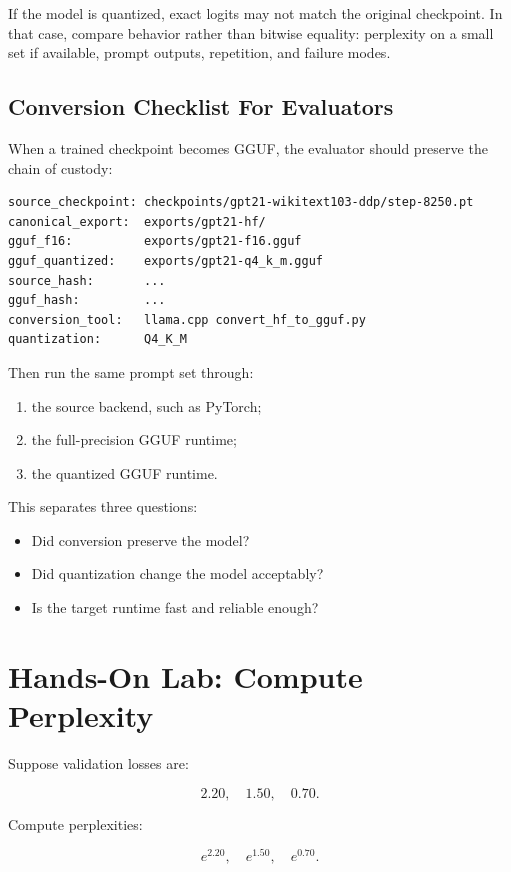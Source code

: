 If the model is quantized, exact logits may not match the original checkpoint. In that
case, compare behavior rather than bitwise equality: perplexity on a small set if
available, prompt outputs, repetition, and failure modes.

\subsection{Conversion Checklist For Evaluators}

When a trained checkpoint becomes GGUF, the evaluator should preserve the chain of
custody:

\begin{lstlisting}
source_checkpoint: checkpoints/gpt21-wikitext103-ddp/step-8250.pt
canonical_export:  exports/gpt21-hf/
gguf_f16:          exports/gpt21-f16.gguf
gguf_quantized:    exports/gpt21-q4_k_m.gguf
source_hash:       ...
gguf_hash:         ...
conversion_tool:   llama.cpp convert_hf_to_gguf.py
quantization:      Q4_K_M
\end{lstlisting}

Then run the same prompt set through:

\begin{enumerate}
  \item the source backend, such as PyTorch;
  \item the full-precision GGUF runtime;
  \item the quantized GGUF runtime.
\end{enumerate}

This separates three questions:

\begin{itemize}
  \item Did conversion preserve the model?
  \item Did quantization change the model acceptably?
  \item Is the target runtime fast and reliable enough?
\end{itemize}

\section{Hands-On Lab: Compute Perplexity}

Suppose validation losses are:

\[
2.20,\quad 1.50,\quad 0.70.
\]

Compute perplexities:

\[
e^{2.20},\quad e^{1.50},\quad e^{0.70}.
\]

